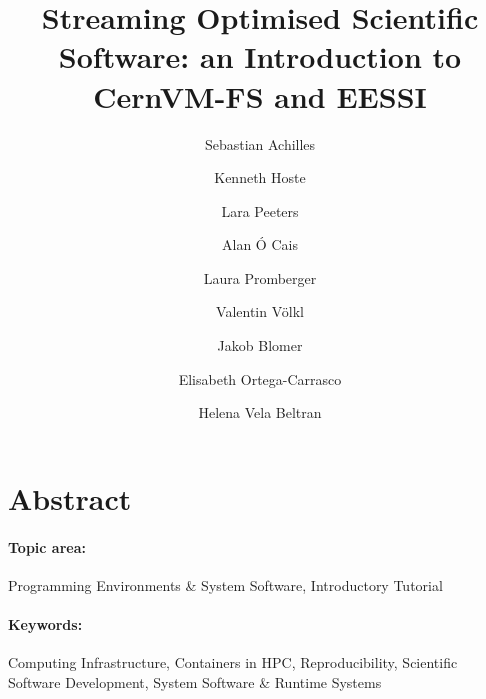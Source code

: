 \documentclass[a4paper,11pt]{article}
\begin{document}

\title{
    \textbf{\LARGE Streaming Optimised Scientific Software: an Introduction to CernVM-FS and EESSI}\\
}

\date{}

\author[1]{Sebastian Achilles}
\author[2]{Kenneth Hoste}
\author[2]{Lara Peeters}
\author[3]{Alan \'O Cais}
\author[4]{Laura Promberger}
\author[4]{Valentin V\"olkl}
\author[4]{Jakob Blomer}
\author[5]{Elisabeth Ortega-Carrasco}
\author[5]{Helena Vela Beltran}


\renewcommand\Authands{ and }

\maketitle


\section*{Abstract}


\paragraph{Topic area:} Programming Environments \& System Software, Introductory Tutorial

\paragraph{Keywords:} Computing Infrastructure, Containers in HPC, Reproducibility, Scientific Software Development, System Software \& Runtime Systems



\newpage
 
\end{document}
